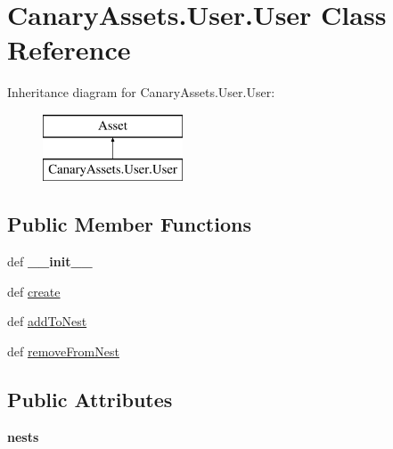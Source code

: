 \hypertarget{class_canary_assets_1_1_user_1_1_user}{\section{Canary\-Assets.\-User.\-User Class Reference}
\label{class_canary_assets_1_1_user_1_1_user}
}
Inheritance diagram for Canary\-Assets.\-User.\-User\-:\begin{figure}[H]
\begin{center}
\leavevmode
\includegraphics[height=2.000000cm]{class_canary_assets_1_1_user_1_1_user}
\end{center}
\end{figure}
\subsection*{Public Member Functions}
\begin{DoxyCompactItemize}
\item 
\hypertarget{class_canary_assets_1_1_user_1_1_user_af4ad306fd8dc77414541b293416f698c}{def {\bfseries \-\_\-\-\_\-init\-\_\-\-\_\-}}\label{class_canary_assets_1_1_user_1_1_user_af4ad306fd8dc77414541b293416f698c}

\item 
def \hyperlink{class_canary_assets_1_1_user_1_1_user_a2d992ff2570cdd10b746ef0a82643b8e}{create}
\item 
def \hyperlink{class_canary_assets_1_1_user_1_1_user_a1a73be79bd9c9360c51059ce7eaf2878}{add\-To\-Nest}
\item 
def \hyperlink{class_canary_assets_1_1_user_1_1_user_afa43d2b1b97ee68a8361c9e069eea374}{remove\-From\-Nest}
\end{DoxyCompactItemize}
\subsection*{Public Attributes}
\begin{DoxyCompactItemize}
\item 
\hypertarget{class_canary_assets_1_1_user_1_1_user_a488d6c32bf529e8a067285ce019aeca3}{{\bfseries nests}}\label{class_canary_assets_1_1_user_1_1_user_a488d6c32bf529e8a067285ce019aeca3}

\end{DoxyCompactItemize}


